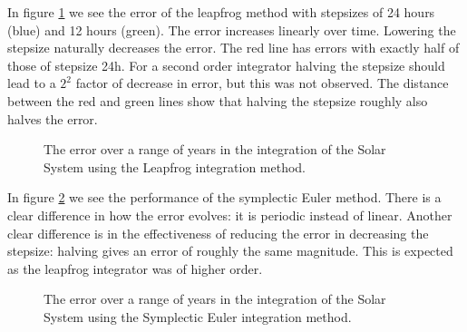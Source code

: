 \documentclass[a4paper]{article}
\begin{document}
In figure \ref{fig:err_leap} we see the error of the leapfrog method with stepsizes of 24 hours
(blue) and 12 hours (green). The error increases linearly over time. Lowering the stepsize naturally
decreases the error. The red line has errors with exactly half of those of stepsize 24h. For a
second order integrator halving the stepsize should lead to a $2^2$ factor of decrease in error, but
this was not observed. The distance between the red and green lines show that halving the stepsize
roughly also halves the error.
\begin{figure}
\caption{The error over a range of years in the integration of the Solar System using the Leapfrog
  integration method.}
\label{fig:err_leap}
\end{figure}

In figure \ref{fig:err_symp} we see the performance of the symplectic Euler method. There is a clear
difference in how the error evolves: it is periodic instead of linear. Another clear difference is
in the effectiveness of reducing the error in decreasing the stepsize: halving gives an error of
roughly the same magnitude. This is expected as the leapfrog integrator was of higher order.
\begin{figure}
\caption{The error over a range of years in the integration of the Solar System using the Symplectic
  Euler integration method.}
\label{fig:err_symp}
\end{figure}
\end{document}
